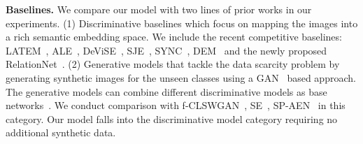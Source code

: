 \documentclass[10pt,twocolumn,letterpaper]{article}
\newcommand\minisection[1]{\vspace{2mm}\noindent \textbf{#1}}
\begin{document}
\minisection{Baselines.} We compare our model with two lines of prior works in our experiments. (1) Discriminative baselines which focus on mapping the images into a rich semantic embedding space. We include the recent 
competitive baselines: LATEM~\cite{zhang2016zero}, ALE~\cite{akata2016label},  DeViSE~\cite{frome2013devise}, 
SJE~\cite{akata2015evaluation}, SYNC~\cite{Changpinyo_2016_CVPR}, DEM~\cite{zhang2017learning} and the newly proposed RelationNet~\cite{yang2018learning}. (2) Generative models that tackle the data
scarcity problem by generating synthetic images for the unseen classes using a GAN~\cite{goodfellow2014generative, zhu2017unpaired} based approach. The generative models can combine different
discriminative models as base networks~\cite{xian2018feature,wang2018low}.
We conduct comparison with f-CLSWGAN~\cite{xian2018feature}, SE~\cite{verma2017generalized}, SP-AEN~\cite{chen2018zero} in this category. Our model falls into the discriminative model category requiring no additional 
synthetic data.



\begin{table}[t]
	\small
	\centering
	\caption{\small Datasets used in GZSL}
	\addtolength{\tabcolsep}{-1pt}
	\label{tab:datasets}
\end{table}
\end{document}
